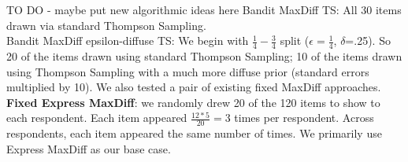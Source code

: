 \documentclass[nonblindrev]{informs3}
\begin{document}
TO DO - maybe put new algorithmic ideas here
Bandit MaxDiff TS: All 30 items drawn via standard Thompson Sampling.\\
Bandit MaxDiff epsilon-diffuse TS: We begin with $\frac{1}{4}-\frac{3}{4}$ split ($\epsilon=\frac{1}{4}$, $\delta$=.25). So 20 of the items drawn using standard Thompson Sampling; 10 of the items drawn using Thompson Sampling with a much more diffuse prior (standard errors multiplied by 10). We also tested a pair of existing fixed MaxDiff approaches.\\
\textbf{Fixed Express MaxDiff}: we randomly drew 20 of the 120 items to show to each respondent.  Each item appeared $\frac{12*5}{20} = 3$ times per respondent.  Across respondents, each item appeared the same number of times. We primarily use Express MaxDiff as our base case.\\
\end{document}

